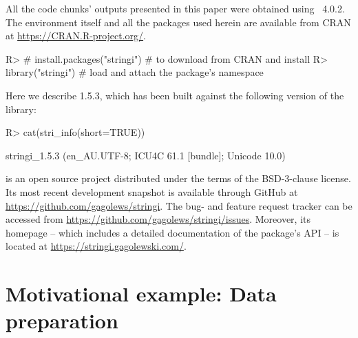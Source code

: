 \documentclass[nojss]{jss}
\begin{document}
All the code chunks' outputs presented in this paper were obtained using
~4.0.2.
The  environment itself and all the packages used herein
are available from CRAN at \url{https://CRAN.R-project.org/}.

\begin{Schunk}
\begin{Sinput}
R> # install.packages("stringi")  # to download from CRAN and install
R> library("stringi")  # load and attach the package's namespace
\end{Sinput}
\end{Schunk}

\noindent
Here we describe  1.5.3,
which has been built against the following version of the  library:



\begin{Schunk}
\begin{Sinput}
R> cat(stri_info(short=TRUE))
\end{Sinput}
\end{Schunk}

\begin{Schunk}
\begin{Soutput}
stringi_1.5.3 (en_AU.UTF-8; ICU4C 61.1 [bundle]; Unicode 10.0)
\end{Soutput}
\end{Schunk}


\noindent
{} is an open source project
distributed under the terms of the BSD-3-clause license.
Its most recent development snapshot is available through GitHub at
\url{https://github.com/gagolews/stringi}. The bug- and feature request
tracker can be accessed from
\url{https://github.com/gagolews/stringi/issues}.
Moreover, its homepage -- which includes a detailed documentation
of the package's API -- is located at \url{https://stringi.gagolewski.com/}.


\section{Motivational example: Data preparation}\label{Sec:examples}
\end{document}
